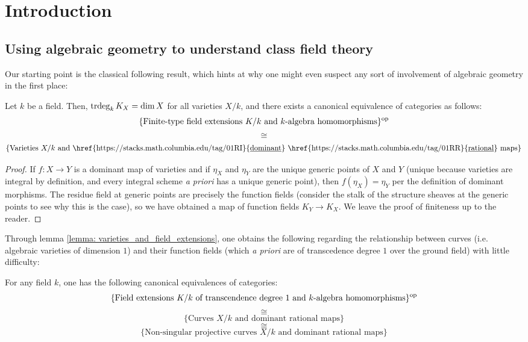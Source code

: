 \section{Introduction}
    \subsection{Using algebraic geometry to understand class field theory}
        Our starting point is the classical following result, which hints at why one might even suspect any sort of involvement of algebraic geometry in the first place:
        \begin{lemma} \label{lemma: varieties_and_field_extensions}
            \cite[\href{https://stacks.math.columbia.edu/tag/0BXN}{Tag 0BXN}]{stacks} Let $k$ be a field. Then, $\operatorname{trdeg}_k K_X = \dim X$ for all varieties $X/k$, and there exists a canonical equivalence of categories as follows:
                $$\{\text{Finite-type field extensions $K/k$ and $k$-algebra homomorphisms}\}^{\mathrm{op}}$$
                $$\cong$$
                $$\{\text{Varieties $X/k$ and \href{https://stacks.math.columbia.edu/tag/01RI}{\underline{dominant}} \href{https://stacks.math.columbia.edu/tag/01RR}{\underline{rational}} maps}\}$$
        \end{lemma}
            \begin{proof}
                If $f: X \to Y$ is a dominant map of varieties and if $\eta_X$ and $\eta_Y$ are the unique generic points of $X$ and $Y$ (unique because varieties are integral by definition, and every integral scheme \textit{a priori} has a unique generic point), then $f(\eta_X) = \eta_Y$ per the definition of dominant morphisms. The residue field at generic points are precisely the function fields (consider the stalk of the structure sheaves at the generic points to see why this is the case), so we have obtained a map of function fields $K_Y \to K_X$. We leave the proof of finiteness up to the reader.
            \end{proof}
        Through lemma \ref{lemma: varieties_and_field_extensions}, one obtains the following regarding the relationship between curves (i.e. algebraic varieties of dimension $1$) and their function fields (which \textit{a priori} are of transcedence degree $1$ over the ground field) with little difficulty:
        \begin{proposition} \label{prop: curves_and_function_fields}
            \cite[\href{https://stacks.math.columbia.edu/tag/0BY1}{Tag 0BY1}]{stacks} For any field $k$, one has the following canonical equivalences of categories:
                $$\{\text{Field extensions $K/k$ of transcendence degree $1$ and $k$-algebra homomorphisms}\}^{\mathrm{op}}$$
                $$\cong$$
                $$\{\text{Curves $X/k$ and dominant rational maps}\}$$
                $$\cong$$
                $$\{\text{Non-singular projective curves $X/k$ and dominant rational maps}\}$$
        \end{proposition}

